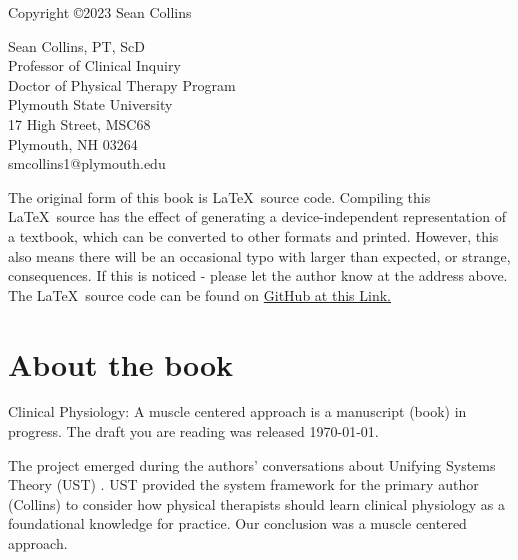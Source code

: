 {\small
Copyright \copyright 2023 Sean Collins

\vspace{0.2in}

\begin{flushleft}
Sean Collins, PT, ScD       \\
Professor of Clinical Inquiry        \\
Doctor of Physical Therapy Program \\
Plymouth State University \\
17 High Street, MSC68 \\
Plymouth, NH 03264 \\
smcollins1@plymouth.edu 
\end{flushleft}

\vspace{0.2in}
The original form of this book is \LaTeX\ source code.  Compiling this \LaTeX\ source has the effect of generating a device-independent representation of a textbook, which can be converted to other formats and printed. However, this also means there will be an occasional typo with larger than expected, or strange, consequences. If this is noticed - please let the author know at the address above. 
The \LaTeX\ source code can be found on \href{https://github.com/scollinspt/Clinical_Physiology}{ GitHub at this Link.}

\newpage
\section*{About the book}
Clinical Physiology: A muscle centered approach is a manuscript (book) in progress. The draft you are reading was released \today.

The project emerged during the authors' conversations about Unifying Systems Theory (UST) \cite{kahlen_perception_2017}. UST provided the system framework for the primary author (Collins) to consider how physical therapists should learn clinical physiology as a foundational knowledge for practice. Our conclusion was a muscle centered approach.

\vspace{0.2in}

}
